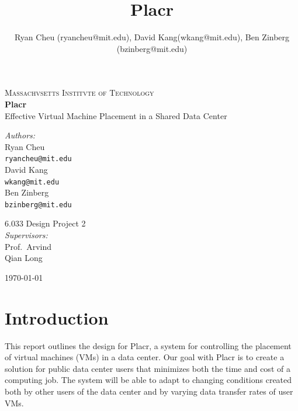\documentclass[11pt]{article}
\title{Placr}
\author{Ryan Cheu (ryancheu@mit.edu), David Kang(wkang@mit.edu), Ben Zinberg (bzinberg@mit.edu)}
\begin{document}
\begin{titlepage}

\begin{center}

\textsc{\LARGE Massachvsetts Institvte of Technology}\\[0.5cm]


{ \huge \bfseries Placr \\[0.4cm] }
{\Large Effective Virtual Machine Placement in a Shared Data Center}\\[0.5cm]


\begin{minipage}{0.4\textwidth}
\begin{flushleft} \large
\emph{Authors:}\\[0.5cm]
Ryan Cheu \\
{\tt ryancheu@mit.edu} \\[1cm]
David Kang \\
{\tt wkang@mit.edu} \\[1cm]
Ben Zinberg \\
{\tt bzinberg@mit.edu}
\end{flushleft}
\end{minipage}
\begin{minipage}{0.4\textwidth}
\begin{flushright} \large
6.033 Design Project 2 \\[0.5cm]
  \emph{Supervisors:} \\[0.2cm]
Prof.\ Arvind \\
Qian Long
\end{flushright}
\end{minipage}

\vfill

{\large \today}

\end{center}

\end{titlepage}

\section{Introduction}

This report outlines the design for Placr, a system for controlling the placement of virtual machines (VMs) in a data center.  Our goal with Placr is to create a solution for public data center users that minimizes both the time and cost of a computing job.  The system will be able to adapt to changing conditions created both by other users of the data center and by varying data transfer rates of user VMs.
\end{document}
